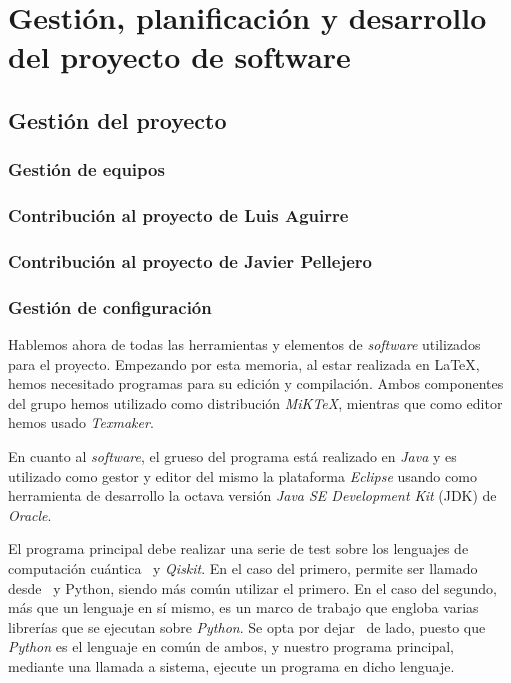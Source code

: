 \chapter[Gestión, planificación y desarrollo del software]{Gestión, planificación y desarrollo del proyecto de software}

\section{Gestión del proyecto}

\subsection{Gestión de equipos}

\subsection{Contribución al proyecto de Luis Aguirre}

\subsection{Contribución al proyecto de Javier Pellejero}

\subsection{Gestión de configuración}

Hablemos ahora de todas las herramientas y elementos de \textit{software} utilizados para el proyecto. Empezando por esta memoria, al estar realizada en \LaTeX, hemos necesitado programas para su edición y compilación. Ambos componentes del grupo hemos utilizado como distribución \textit{MiKTeX}, mientras que como editor hemos usado \textit{Texmaker}.

En cuanto al \textit{software}, el grueso del programa está realizado en \textit{Java} y es utilizado como gestor y editor del mismo la plataforma \textit{Eclipse} usando como herramienta de desarrollo la octava versión \textit{Java SE Development Kit} (JDK) de \textit{Oracle}.

El programa principal debe realizar una serie de test sobre los lenguajes de computación cuántica \qsh\ y \textit{Qiskit}. En el caso del primero, permite ser llamado desde \csh\ y {Python}, siendo más común utilizar el primero. En el caso del segundo, más que un lenguaje en sí mismo, es un marco de trabajo que engloba varias librerías que se ejecutan sobre \textit{Python}. Se opta por dejar \csh\ de lado, puesto que \textit{Python} es el lenguaje en común de ambos, y nuestro programa principal, mediante una llamada a sistema, ejecute un programa en dicho lenguaje.

